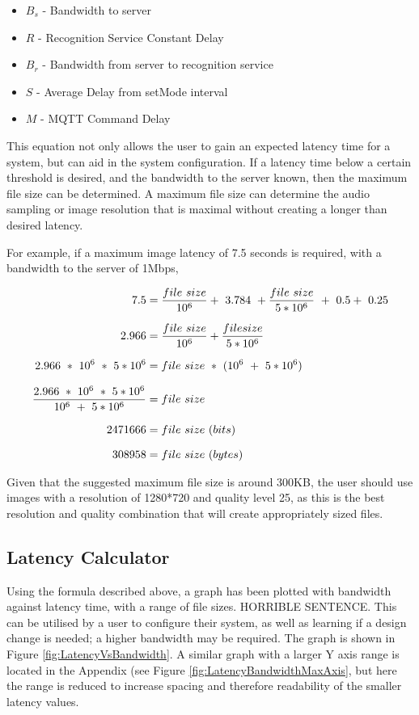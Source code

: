 \documentclass{article}
\begin{document}
\begin{itemize}
	\item $B_s$ - Bandwidth to server
	\item $R$ - Recognition Service Constant Delay
	\item $B_r$ - Bandwidth from server to recognition service
	\item $S$ - Average Delay from setMode interval
	\item $M$ - MQTT Command Delay
\end{itemize}

This equation not only allows the user to gain an expected latency time for a system, but can aid in the system configuration. If a latency time below a certain threshold is desired, and the bandwidth to the server known, then the maximum file size can be determined. A maximum file size can determine the audio sampling or image resolution that is maximal without creating a longer than desired latency.

For example, if a maximum image latency of 7.5 seconds is required, with a bandwidth to the server of 1Mbps, 

\begin{equation*}
\setlength{\jot}{10pt}
\begin{split}
7.5 	&= \frac{file\ size}{10^6} +\ 3.784\ + \frac{file\ size}{5*10^6}\ +\ 0.5 +\ 0.25 \\
2.966 &= \frac{file\ size}{10^6} + \frac{file size}{5*10^6} \\
2.966\ *\ 10^6\ *\ 5*10^6 &= file\ size\ *\ (10^6\ +\ 5*10^6) \\
\frac{2.966\ *\ 10^6\ *\ 5*10^6}{10^6\ +\ 5*10^6 } &= file\ size \\
 2471666&= file\ size\ (bits) \\
 308958 &= file\ size\ (bytes)
\end{split}
\end{equation*}

Given that the suggested maximum file size is around 300KB, the user should use images with a resolution of 1280*720 and quality level 25, as this is the best resolution and quality combination that will create appropriately sized files.

\subsection{Latency Calculator}
Using the formula described above, a graph has been plotted with bandwidth against latency time, with a range of file sizes. HORRIBLE SENTENCE. This can be utilised by a user to configure their system, as well as learning if a design change is needed; a higher bandwidth may be required. The graph is shown in Figure \ref{fig:LatencyVsBandwidth}. A similar graph with a larger Y axis range is located in the Appendix (see Figure \ref{fig:LatencyBandwidthMaxAxis}, but here the range is reduced to increase spacing and therefore readability of the smaller latency values. 
\end{document}
